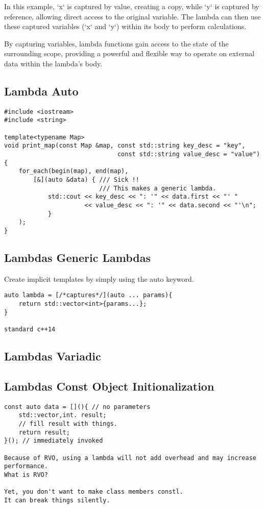 In this example, `x` is captured by value,
creating a copy, while `y` is captured by reference,
allowing direct access to the original variable.
The lambda can then use these captured variables (`x` and `y`)
within its body to perform calculations.

By capturing variables,
lambda functions gain access to the state of the surrounding scope,
providing a powerful and flexible way to operate 
on external data within the lambda's body.

\subsection{Lambda Auto}
\begin{verbatim}
#include <iostream>
#include <string>

template<typename Map>
void print_map(const Map &map, const std::string key_desc = "key",
                               const std::string value_desc = "value")
{
    for_each(begin(map), end(map),
        [&](auto &data) { /// Sick !!
                          /// This makes a generic lambda.
            std::cout << key_desc << ": '" << data.first << "' "
                      << value_desc << ": '" << data.second << "'\n";
            }
    );
}
\end{verbatim}

\subsection{Lambdas Generic Lambdas}

Create implicit templates by simply using the auto keyword.

\begin{verbatim}
auto lambda = [/*captures*/](auto ... params){
    return std::vector<int>{params...};
}

standard c++14
\end{verbatim}

\subsection{Lambdas Variadic}

\subsection{Lambdas Const Object Initionalization}

\begin{verbatim}
const auto data = [](){ // no parameters
    std::vector,int. result;
    // fill result with things. 
    return result;
}(); // immediately invoked

Because of RVO, using a lambda will not add overhead and may increase performance.
What is RVO?

Yet, you don't want to make class members constl.
It can break things silently. 
\end{verbatim}

